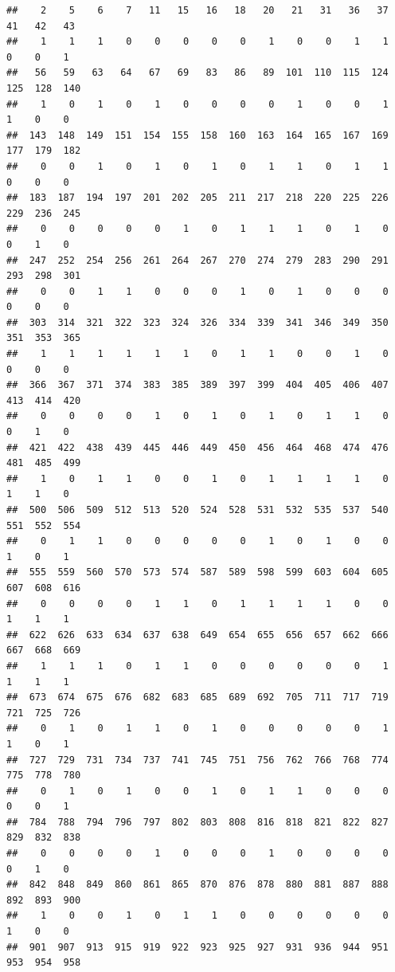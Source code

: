 \documentclass[
]{article}
\begin{document}
\begin{verbatim}
##    2    5    6    7   11   15   16   18   20   21   31   36   37   41   42   43 
##    1    1    1    0    0    0    0    0    1    0    0    1    1    0    0    1 
##   56   59   63   64   67   69   83   86   89  101  110  115  124  125  128  140 
##    1    0    1    0    1    0    0    0    0    1    0    0    1    1    0    0 
##  143  148  149  151  154  155  158  160  163  164  165  167  169  177  179  182 
##    0    0    1    0    1    0    1    0    1    1    0    1    1    0    0    0 
##  183  187  194  197  201  202  205  211  217  218  220  225  226  229  236  245 
##    0    0    0    0    0    1    0    1    1    1    0    1    0    0    1    0 
##  247  252  254  256  261  264  267  270  274  279  283  290  291  293  298  301 
##    0    0    1    1    0    0    0    1    0    1    0    0    0    0    0    0 
##  303  314  321  322  323  324  326  334  339  341  346  349  350  351  353  365 
##    1    1    1    1    1    1    0    1    1    0    0    1    0    0    0    0 
##  366  367  371  374  383  385  389  397  399  404  405  406  407  413  414  420 
##    0    0    0    0    1    0    1    0    1    0    1    1    0    0    1    0 
##  421  422  438  439  445  446  449  450  456  464  468  474  476  481  485  499 
##    1    0    1    1    0    0    1    0    1    1    1    1    0    1    1    0 
##  500  506  509  512  513  520  524  528  531  532  535  537  540  551  552  554 
##    0    1    1    0    0    0    0    0    1    0    1    0    0    1    0    1 
##  555  559  560  570  573  574  587  589  598  599  603  604  605  607  608  616 
##    0    0    0    0    1    1    0    1    1    1    1    0    0    1    1    1 
##  622  626  633  634  637  638  649  654  655  656  657  662  666  667  668  669 
##    1    1    1    0    1    1    0    0    0    0    0    0    1    1    1    1 
##  673  674  675  676  682  683  685  689  692  705  711  717  719  721  725  726 
##    0    1    0    1    1    0    1    0    0    0    0    0    1    1    0    1 
##  727  729  731  734  737  741  745  751  756  762  766  768  774  775  778  780 
##    0    1    0    1    0    0    1    0    1    1    0    0    0    0    0    1 
##  784  788  794  796  797  802  803  808  816  818  821  822  827  829  832  838 
##    0    0    0    0    1    0    0    0    1    0    0    0    0    0    1    0 
##  842  848  849  860  861  865  870  876  878  880  881  887  888  892  893  900 
##    1    0    0    1    0    1    1    0    0    0    0    0    0    1    0    0 
##  901  907  913  915  919  922  923  925  927  931  936  944  951  953  954  958 

\end{verbatim}
\end{document}
